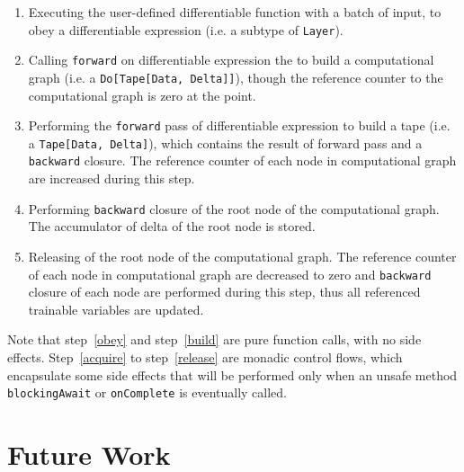 \begin{enumerate}
  \item Executing the user-defined \gls{differentiable function} with a batch of input, to obey a \gls{differentiable expression} (i.e. a subtype of \lstinline{Layer}).
  \label{obey}
  
  \item Calling \lstinline{forward} on \gls{differentiable expression} the to build a \gls{computational graph} (i.e. a \lstinline{Do[Tape[Data, Delta]]}), though the reference counter to the \gls{computational graph} is zero at the point.
  \label{build}
  
  \item Performing the \lstinline{forward} pass of \gls{differentiable expression} to build a tape (i.e. a \lstinline{Tape[Data, Delta]}), which contains the result of forward pass and a \lstinline{backward} closure. The reference counter of each node in \gls{computational graph} are increased during this step.
  \label{acquire}

  \item Performing \lstinline{backward} closure of the root node of the \gls{computational graph}. The accumulator of delta of the root node is stored.

  \item Releasing of the root node of the \gls{computational graph}. The reference counter of each node in \gls{computational graph} are decreased to zero and \lstinline{backward} closure of each node are performed during this step, thus all referenced \glspl{trainable variable} are updated.
  \label{release}

\end{enumerate}

Note that step~\ref{obey} and step~\ref{build} are pure function calls, with no side effects. Step~\ref{acquire} to step~\ref{release} are monadic control flows, which encapsulate some side effects that will be performed only when an unsafe method \lstinline{blockingAwait} or \lstinline{onComplete} is eventually called.

\section{Future Work}

